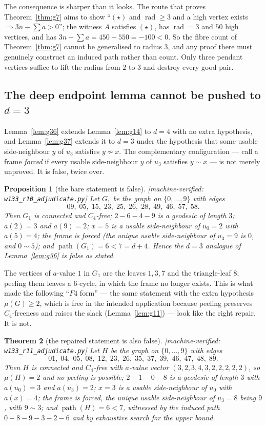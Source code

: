 \documentclass[11pt]{article}
\theoremstyle{plain}
\newtheorem{theorem}{Theorem}[section]
\newtheorem{proposition}[theorem]{Proposition}
\theoremstyle{definition}
\theoremstyle{remark}
\numberwithin{equation}{section}
\newcommand{\rad}{\operatorname{rad}}
\newcommand{\pth}{\operatorname{path}}
\newcommand{\statusbox}[1]{{\small\sloppy\textsf{[#1]}}}
\newcommand{\MV}[1]{\statusbox{machine-verified: \texttt{#1}}}
\begin{document}
The consequence is sharper than it looks. The route that proves Theorem~\ref{thm:g7} aims to
show ``$(\star)$ and $\rad \ge 3$ and a high vertex exists $\Rightarrow 3n - \sum a > 0$'';
the witness $A$ satisfies $(\star)$, has $\rad = 3$ and $50$ high vertices, and has
$3n - \sum a = 450-550 = -100 < 0$. So the fibre count of Theorem~\ref{thm:g7} cannot be
generalised to radius $3$, and any proof there must genuinely construct an induced path
rather than count. Only three pendant vertices suffice to lift the radius from $2$ to $3$ and
destroy every good pair.

\subsection{The deep endpoint lemma cannot be pushed to $d = 3$}

Lemma~\ref{lem:g36} extends Lemma~\ref{lem:g14} to $d = 4$ with no extra hypothesis, and
Lemma~\ref{lem:g37} extends it to $d = 3$ under the hypothesis that some usable side-neighbour
$y$ of $u_3$ satisfies $y \not\sim x$. The complementary configuration --- call a frame
\emph{forced} if every usable side-neighbour $y$ of $u_3$ satisfies $y \sim x$ --- is not
merely unproved. It is false, twice over.

\begin{proposition}[the bare statement is false]\label{prop:ce1}
\MV{w133\_r10\_adjudicate.py}
Let $G_1$ be the graph on $\{0,\dots,9\}$ with edges
\[
  09,\; 05,\; 15,\; 23,\; 25,\; 26,\; 28,\; 49,\; 46,\; 57,\; 58 .
\]
Then $G_1$ is connected and $C_4$-free; $2-6-4-9$ is a geodesic of length $3$;
$a(2) = 3$ and $a(9) = 2$; $x = 5$ is a usable side-neighbour of $u_0 = 2$ with $a(5) = 4$;
the frame is forced (the unique usable side-neighbour of $u_3 = 9$ is $0$, and $0 \sim 5$);
and $\pth(G_1) = 6 < 7 = d+4$. Hence the $d = 3$ analogue of Lemma~\ref{lem:g36} is false as
stated.
\end{proposition}

The vertices of $a$-value $1$ in $G_1$ are the leaves $1,3,7$ and the triangle-leaf $8$;
peeling them leaves a $6$-cycle, in which the frame no longer exists. This is what made the
following ``$F4$ form'' --- the same statement with the extra hypothesis $\mu(G)\ge 2$, which
is free in the intended application because peeling preserves $C_4$-freeness and raises the
slack (Lemma~\ref{lem:g11}) --- look like the right repair. It is not.

\begin{theorem}[the repaired statement is also false]\label{thm:g45}
\MV{w133\_r11\_adjudicate.py}
Let $H$ be the graph on $\{0,\dots,9\}$ with edges
\[
  01,\;04,\;05,\;08,\;12,\;23,\;26,\;35,\;37,\;39,\;46,\;47,\;48,\;89 .
\]
Then $H$ is connected and $C_4$-free with $a$-value vector
$(3,2,3,4,3,2,2,2,2,2)$, so $\mu(H) = 2$ and \emph{no peeling is possible};
$2-1-0-8$ is a geodesic of length $3$ with $a(u_0) = 3$ and $a(u_3) = 2$; $x = 3$ is a usable
side-neighbour of $u_0$ with $a(x) = 4$; the frame is forced, the unique usable
side-neighbour of $u_3 = 8$ being $9$, with $9 \sim 3$; and $\pth(H) = 6 < 7$, witnessed by
the induced path $0-8-9-3-2-6$ and by exhaustive search for the upper bound.
\end{theorem}
\end{document}
